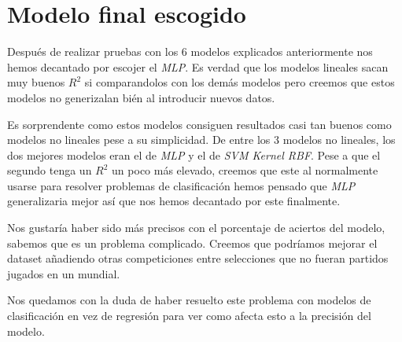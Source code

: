 \section{Modelo final escogido}
Después de realizar pruebas con los 6 modelos explicados anteriormente nos hemos decantado por escojer el \textit{MLP}. Es verdad que los modelos lineales sacan muy buenos $R^2$ si comparandolos con los demás modelos pero creemos que estos modelos no generizalan bién al introducir nuevos datos. 
\newline

Es sorprendente como estos modelos consiguen resultados casi tan buenos como modelos no lineales pese a su simplicidad. De entre los 3 modelos no lineales, los dos mejores modelos eran el de \textit{MLP} y el de \textit{SVM Kernel RBF}. Pese a que el segundo tenga un $R^2$ un poco más elevado, creemos que este al normalmente usarse para resolver problemas de clasificación hemos pensado que \textit{MLP} generalizaria mejor así que nos hemos decantado por este finalmente.
\newline

Nos gustaría haber sido más precisos con el porcentaje de aciertos del modelo, sabemos que es un problema complicado. Creemos que podríamos mejorar el dataset añadiendo otras competiciones entre selecciones que no fueran partidos jugados en un mundial.
\newline

Nos quedamos con la duda de haber resuelto este problema con modelos de clasificación en vez de regresión para ver como afecta esto a la precisión del modelo.

\newpage